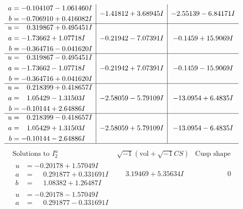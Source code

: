 \documentclass[1p]{elsarticle_modified}
\theoremstyle{definition}
\newcommand{\I}{\sqrt{-1}}
\begin{document}
$$\begin{array}{c|c|c}
\begin{aligned}
a &= -0.104107 - 1.061460 I \\
b &= -0.706910 + 0.416082 I\end{aligned}
 & -1.41812 + 3.68945 I & -2.55139 - 6.84171 I \\ \hline\begin{aligned}
u &= \phantom{-}0.319867 + 0.495451 I \\
a &= -1.73662 + 1.07718 I \\
b &= -0.364716 - 0.041620 I\end{aligned}
 & -0.21942 - 7.07391 I & -0.1459 + 15.9069 I \\ \hline\begin{aligned}
u &= \phantom{-}0.319867 - 0.495451 I \\
a &= -1.73662 - 1.07718 I \\
b &= -0.364716 + 0.041620 I\end{aligned}
 & -0.21942 + 7.07391 I & -0.1459 - 15.9069 I \\ \hline\begin{aligned}
u &= \phantom{-}0.218399 + 0.418657 I \\
a &= \phantom{-}1.05429 - 1.31503 I \\
b &= -0.10144 + 2.64886 I\end{aligned}
 & -2.58059 - 5.79109 I & -13.0954 + 6.4835 I \\ \hline\begin{aligned}
u &= \phantom{-}0.218399 - 0.418657 I \\
a &= \phantom{-}1.05429 + 1.31503 I \\
b &= -0.10144 - 2.64886 I\end{aligned}
 & -2.58059 + 5.79109 I & -13.0954 - 6.4835 I\\
 \hline 
 \end{array}$$\newpage$$\begin{array}{c|c|c}  
\text{Solutions to }I^u_{2}& \I (\text{vol} + \sqrt{-1}CS) & \text{Cusp shape}\\
 \hline 
\begin{aligned}
u &= -0.20178 + 1.57049 I \\
a &= \phantom{-}0.291877 + 0.331691 I \\
b &= \phantom{-}1.08382 + 1.26487 I\end{aligned}
 & \phantom{-}3.19469 + 5.35634 I & \phantom{-0.000000 } 0 \\ \hline\begin{aligned}
u &= -0.20178 - 1.57049 I \\
a &= \phantom{-}0.291877 - 0.331691 I \\

\end{aligned}
\end{array}$$
\end{document}
